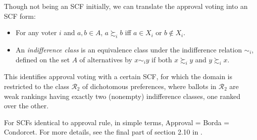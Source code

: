 Though not being an SCF initially, we can translate the approval voting into an SCF form:

\begin{definition}
    \begin{itemize}
        \item For any voter $i$ and $a,b \in A$, $a \succsim_i b$ iff $a \in X_i$ or $b \not \in X_i$. 
        \item An \emph{indifference class} is an equivalence class under the indifference relation $\sim_i$, defined on the set $A$ of alternatives by $x \sim_i y$ if both $x \succsim_i y$ and $y \succsim_i x$.
    \end{itemize}
\end{definition}

This identifies approval voting with a certain SCF, for which the domain is restricted to the class $\mathcal{R}_2$ of dichotomous preferences, where ballots in $\mathcal{R}_2$ are weak rankings having exactly two (nonempty) indifference classes, one ranked over the other. 

For SCFs identical to approval rule, in simple terms, Approval = Borda = Condorcet. For more details, see the final part of section 2.10 in \textcite{Moulin2016}.